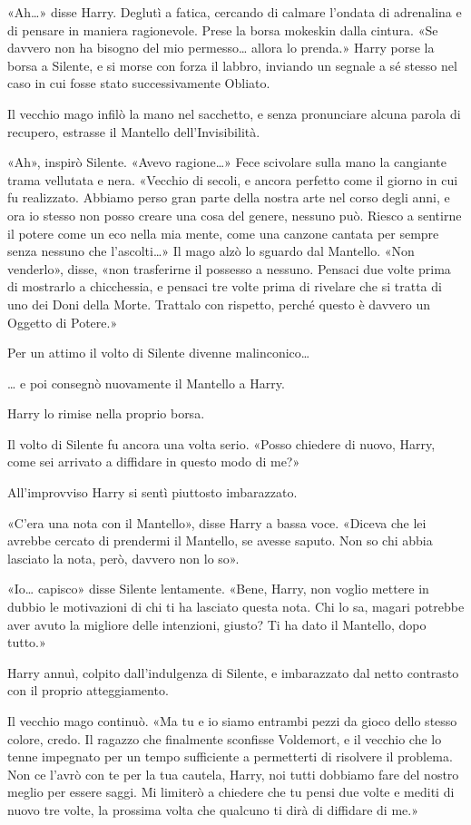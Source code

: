 «Ah…» disse Harry. Deglutì a fatica, cercando di calmare l’ondata di adrenalina e di pensare in maniera ragionevole. Prese la borsa mokeskin dalla cintura. «Se davvero non ha bisogno del mio permesso… allora lo prenda.» Harry porse la borsa a Silente, e si morse con forza il labbro, inviando un segnale a sé stesso nel caso in cui fosse stato successivamente Obliato.

Il vecchio mago infilò la mano nel sacchetto, e senza pronunciare alcuna parola di recupero, estrasse il Mantello dell’Invisibilità.

«Ah», inspirò Silente. «Avevo ragione…» Fece scivolare sulla mano la cangiante trama vellutata e nera. «Vecchio di secoli, e ancora perfetto come il giorno in cui fu realizzato. Abbiamo perso gran parte della nostra arte nel corso degli anni, e ora io stesso non posso creare una cosa del genere, nessuno può. Riesco a sentirne il potere come un eco nella mia mente, come una canzone cantata per sempre senza nessuno che l’ascolti…» Il mago alzò lo sguardo dal Mantello. «Non venderlo», disse, «non trasferirne il possesso a nessuno. Pensaci due volte prima di mostrarlo a chicchessia, e pensaci tre volte prima di rivelare che si tratta di uno dei Doni della Morte. Trattalo con rispetto, perché questo è davvero un Oggetto di Potere.»

Per un attimo il volto di Silente divenne malinconico…

… e poi consegnò nuovamente il Mantello a Harry.

Harry lo rimise nella proprio borsa.

Il volto di Silente fu ancora una volta serio. «Posso chiedere di nuovo, Harry, come sei arrivato a diffidare in questo modo di me?»

All’improvviso Harry si sentì piuttosto imbarazzato.

«C’era una nota con il Mantello», disse Harry a bassa voce. «Diceva che lei avrebbe cercato di prendermi il Mantello, se avesse saputo. Non so chi abbia lasciato la nota, però, davvero non lo so».

«Io… capisco» disse Silente lentamente. «Bene, Harry, non voglio mettere in dubbio le motivazioni di chi ti ha lasciato questa nota. Chi lo sa, magari potrebbe aver avuto la migliore delle intenzioni, giusto? Ti ha dato il Mantello, dopo tutto.»

Harry annuì, colpito dall’indulgenza di Silente, e imbarazzato dal netto contrasto con il proprio atteggiamento.

Il vecchio mago continuò. «Ma tu e io siamo entrambi pezzi da gioco dello stesso colore, credo. Il ragazzo che finalmente sconfisse Voldemort, e il vecchio che lo tenne impegnato per un tempo sufficiente a permetterti di risolvere il problema. Non ce l’avrò con te per la tua cautela, Harry, noi tutti dobbiamo fare del nostro meglio per essere saggi. Mi limiterò a chiedere che tu pensi due volte e mediti di nuovo tre volte, la prossima volta che qualcuno ti dirà di diffidare di me.»

